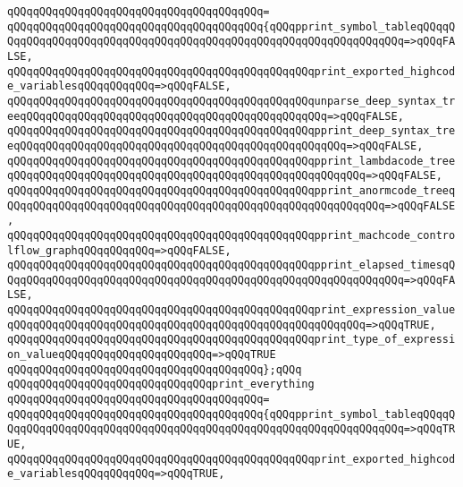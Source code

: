 \verb|qQQqqQQqqQQqqQQqqQQqqQQqqQQqqQQqqQQqqQQq=|\newline
\verb|qQQqqQQqqQQqqQQqqQQqqQQqqQQqqQQqqQQqqQQq{qQQqpprint_symbol_tableqQQqqQQqqQQqqQQqqQQqqQQqqQQqqQQqqQQqqQQqqQQqqQQqqQQqqQQqqQQqqQQqqQQq=>qQQqFALSE,|\newline
\verb|qQQqqQQqqQQqqQQqqQQqqQQqqQQqqQQqqQQqqQQqqQQqqQQqprint_exported_highcode_variablesqQQqqQQqqQQq=>qQQqFALSE,|\newline
\verb|qQQqqQQqqQQqqQQqqQQqqQQqqQQqqQQqqQQqqQQqqQQqqQQqunparse_deep_syntax_treeqQQqqQQqqQQqqQQqqQQqqQQqqQQqqQQqqQQqqQQqqQQqqQQq=>qQQqFALSE,|\newline
\verb|qQQqqQQqqQQqqQQqqQQqqQQqqQQqqQQqqQQqqQQqqQQqqQQqpprint_deep_syntax_treeqQQqqQQqqQQqqQQqqQQqqQQqqQQqqQQqqQQqqQQqqQQqqQQqqQQq=>qQQqFALSE,|\newline
\verb|qQQqqQQqqQQqqQQqqQQqqQQqqQQqqQQqqQQqqQQqqQQqqQQqpprint_lambdacode_treeqQQqqQQqqQQqqQQqqQQqqQQqqQQqqQQqqQQqqQQqqQQqqQQqqQQqqQQq=>qQQqFALSE,|\newline
\verb|qQQqqQQqqQQqqQQqqQQqqQQqqQQqqQQqqQQqqQQqqQQqqQQqpprint_anormcode_treeqQQqqQQqqQQqqQQqqQQqqQQqqQQqqQQqqQQqqQQqqQQqqQQqqQQqqQQqqQQq=>qQQqFALSE,|\newline
\verb|qQQqqQQqqQQqqQQqqQQqqQQqqQQqqQQqqQQqqQQqqQQqqQQqpprint_machcode_controlflow_graphqQQqqQQqqQQq=>qQQqFALSE,|\newline
\verb|qQQqqQQqqQQqqQQqqQQqqQQqqQQqqQQqqQQqqQQqqQQqqQQqpprint_elapsed_timesqQQqqQQqqQQqqQQqqQQqqQQqqQQqqQQqqQQqqQQqqQQqqQQqqQQqqQQqqQQqqQQq=>qQQqFALSE,|\newline
\verb|qQQqqQQqqQQqqQQqqQQqqQQqqQQqqQQqqQQqqQQqqQQqqQQqprint_expression_valueqQQqqQQqqQQqqQQqqQQqqQQqqQQqqQQqqQQqqQQqqQQqqQQqqQQqqQQq=>qQQqTRUE,|\newline
\verb|qQQqqQQqqQQqqQQqqQQqqQQqqQQqqQQqqQQqqQQqqQQqqQQqprint_type_of_expression_valueqQQqqQQqqQQqqQQqqQQqqQQq=>qQQqTRUE|\newline
\verb|qQQqqQQqqQQqqQQqqQQqqQQqqQQqqQQqqQQqqQQq};qQQq|\newline
\newline
\verb|qQQqqQQqqQQqqQQqqQQqqQQqqQQqqQQqprint_everything|\newline
\verb|qQQqqQQqqQQqqQQqqQQqqQQqqQQqqQQqqQQqqQQq=|\newline
\verb|qQQqqQQqqQQqqQQqqQQqqQQqqQQqqQQqqQQqqQQq{qQQqpprint_symbol_tableqQQqqQQqqQQqqQQqqQQqqQQqqQQqqQQqqQQqqQQqqQQqqQQqqQQqqQQqqQQqqQQqqQQq=>qQQqTRUE,|\newline
\verb|qQQqqQQqqQQqqQQqqQQqqQQqqQQqqQQqqQQqqQQqqQQqqQQqprint_exported_highcode_variablesqQQqqQQqqQQq=>qQQqTRUE,|\newline
